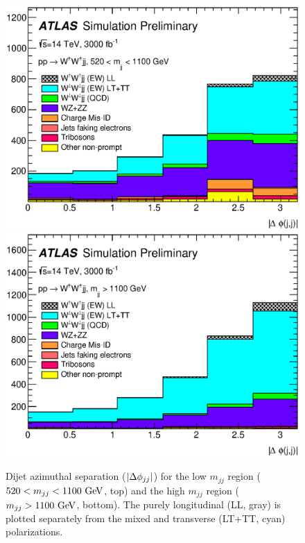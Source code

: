 \begin{figure}[htbp]
  \centering
  \includegraphics[width=.8\textwidth]{figs/ssww_upgrade/results/plots_optimisedLL_all_pass9_dijet_absdphijj_lowmjj}\\
  \includegraphics[width=.8\textwidth]{figs/ssww_upgrade/results/plots_optimisedLL_all_pass9_dijet_absdphijj_highmjj}
  \caption{Dijet azimuthal separation ($|\Delta\phi_{jj}|$) for the low $m_{jj}$ region ($520 < m_{jj} < 1100\gev$, top) and the high $m_{jj}$ region ($m_{jj} > 1100\gev$, bottom).  The purely longitudinal (LL, gray) is plotted separately from the mixed and transverse (LT+TT, cyan) polarizations.}
  \label{fig:sswwupgrade_dphijj_LL}
\end{figure}

